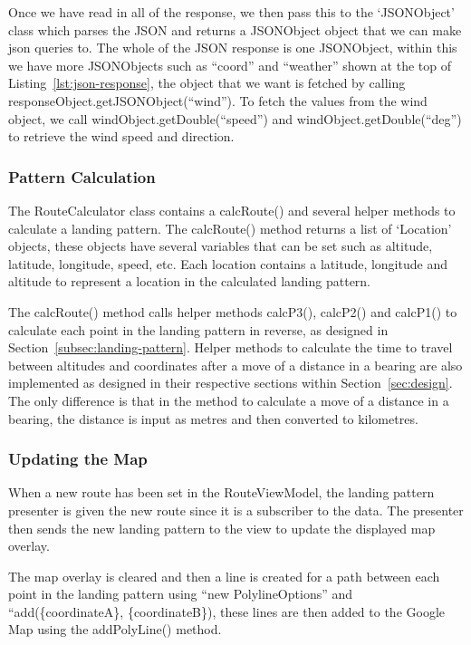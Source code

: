 Once we have read in all of the response, we then pass this to the `JSONObject' class which parses the JSON and returns a JSONObject object that we can make json queries to. The whole of the JSON response is one JSONObject, within this we have more JSONObjects such as ``coord'' and ``weather'' shown at the top of Listing~\vref{lst:json-response}, the object that we want is fetched by calling responseObject.getJSONObject(``wind''). To fetch the values from the wind object, we call windObject.getDouble(``speed'') and windObject.getDouble(``deg'') to retrieve the wind speed and direction.

\subsubsection{Pattern Calculation}\label{subsubsec:pattern-calculation}
The RouteCalculator class contains a calcRoute() and several helper methods to calculate a landing pattern. The calcRoute() method returns a list of `Location' objects, these objects have several variables that can be set such as altitude, latitude, longitude, speed, etc. Each location contains a latitude, longitude and altitude to represent a location in the calculated landing pattern.

The calcRoute() method calls helper methods calcP3(), calcP2() and calcP1() to calculate each point in the landing pattern in reverse, as designed in Section~\ref{subsec:landing-pattern}. Helper methods to calculate the time to travel between altitudes and coordinates after a move of a distance in a bearing are also implemented as designed in their respective sections within Section~\ref{sec:design}. The only difference is that in the method to calculate a move of a distance in a bearing, the distance is input as metres and then converted to kilometres.

\subsubsection{Updating the Map}
When a new route has been set in the RouteViewModel, the landing pattern presenter is given the new route since it is a subscriber to the data. The presenter then sends the new landing pattern to the view to update the displayed map overlay.

The map overlay is cleared and then a line is created for a path between each point in the landing pattern using ``new PolylineOptions'' and ``add(\{coordinateA\}, \{coordinateB\}), these lines are then added to the Google Map using the addPolyLine() method.

